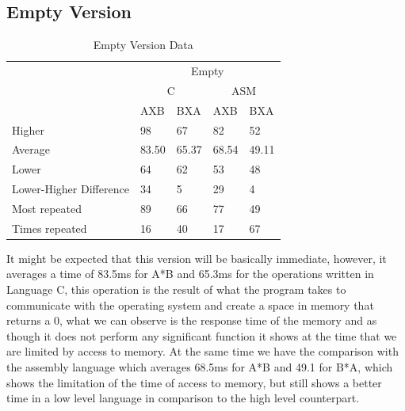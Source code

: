 \documentclass[legalpaper,12pt]{article}
\begin{document}
\subsection{Empty Version}
    \begin{table}[h]
        \caption{Empty Version Data}
        \centering
        \begin{tabular}{|l|l|l|l|l|}
        \hline
        \multirow{3}{*}{}       & \multicolumn{4}{c|}{Empty}                        \\ \cline{2-5} 
                                & \multicolumn{2}{c|}{C} & \multicolumn{2}{c|}{ASM} \\ \cline{2-5} 
                                & AXB        & BXA       & AXB         & BXA        \\ \hline
        Higher                  & 98         & 67        & 82          & 52         \\ \hline
        Average                 & 83.50      & 65.37     & 68.54       & 49.11      \\ \hline
        Lower                   & 64         & 62        & 53          & 48         \\ \hline\hline
        Lower-Higher Difference & 34         & 5         & 29          & 4          \\ \hline\hline
        Most repeated           & 89         & 66        & 77          & 49         \\ \hline
        Times repeated          & 16         & 40        & 17          & 67         \\ \hline
        \end{tabular}
        \label{resultados1}
    \end{table}
    \justifying
    It might be expected that this version will be basically immediate, however, it averages a time of 83.5ms for A*B and 65.3ms for the operations written in Language C, this operation is the result of what the program takes to communicate with the operating system and create a space in memory that returns a 0, what we can observe is the response time of the memory and as though it does not perform any significant function it shows at the time that we are limited by access to memory.
    \justifying    
    At the same time we have the comparison with the assembly language which averages 68.5ms for A*B and 49.1 for B*A, which shows the limitation of the time of access to memory, but still shows a better time in a low level language in comparison to the high level counterpart.
    
\end{document}
